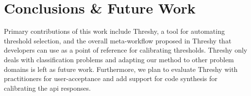 \section{Conclusions \& Future Work}
\label{fse-demo2020:sec:conclusion}

Primary contributions of this work include Threshy, a tool for automating threshold selection, and the overall meta-workflow proposed in Threshy that developers can use as a point of reference for calibrating thresholds. Threshy only deals with classification problems and adapting our method to other problem domains is left as future work. Furthermore, we plan to evaluate Threshy with practitioners for user-acceptance and add support for code synthesis for calibrating the \gls{api} responses.
